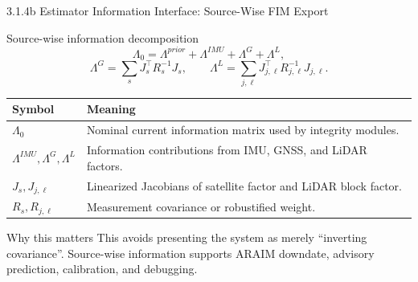 \documentclass[10pt,aspectratio=169,xcolor=dvipsnames]{beamer}
\begin{document}
\begin{frame}{3.1.4b Estimator Information Interface: Source-Wise FIM Export}

  \small
  \begin{block}{Source-wise information decomposition}
    \[
      \Lambda_0=\Lambda^{prior}+\Lambda^{IMU}+\Lambda^G+\Lambda^L,
    \]
    \[
      \Lambda^G=\sum_s J_s^\top R_s^{-1}J_s,\qquad
      \Lambda^L=\sum_{j,\ell}J_{j,\ell}^\top R_{j,\ell}^{-1}J_{j,\ell}.
    \]
  \end{block}
  \begin{table}\scriptsize
    \begin{tabular}{p{} p{}}
      \toprule
      \textbf{Symbol} & \textbf{Meaning}\\
      \midrule
      $\Lambda_0$ & Nominal current information matrix used by integrity modules.\\
      $\Lambda^{IMU},\Lambda^G,\Lambda^L$ & Information contributions from IMU, GNSS, and LiDAR factors.\\
      $J_s,J_{j,\ell}$ & Linearized Jacobians of satellite factor and LiDAR block factor.\\
      $R_s,R_{j,\ell}$ & Measurement covariance or robustified weight.\\
      \bottomrule
    \end{tabular}
  \end{table}
  \begin{alertblock}{Why this matters}
    \footnotesize This avoids presenting the system as merely ``inverting covariance''. Source-wise information supports ARAIM downdate, advisory prediction, calibration, and debugging.
  \end{alertblock}

\end{frame}
\end{document}
